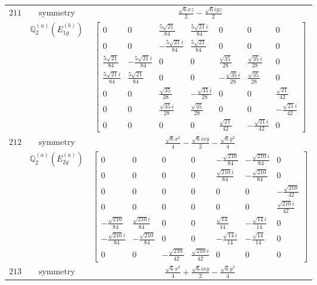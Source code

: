 \documentclass[fleqn,8pt,landscape]{jsarticle}
\begin{document}
\begin{longtable}{ccc}
$ 211 $ & $ \text{symmetry} $ & $ \frac{\sqrt{6} x z}{2} - \frac{\sqrt{6} i y z}{2} $ \\
$  $ & $ \mathbb{Q}_{2}^{(a)}(E_{1g}^{(b)}) $ & $ \begin{bmatrix} 0 & 0 & \frac{5 \sqrt{21}}{84} & \frac{5 \sqrt{21} i}{84} & 0 & 0 & 0 \\ 0 & 0 & - \frac{5 \sqrt{21} i}{84} & \frac{5 \sqrt{21}}{84} & 0 & 0 & 0 \\ \frac{5 \sqrt{21}}{84} & - \frac{5 \sqrt{21} i}{84} & 0 & 0 & \frac{\sqrt{35}}{28} & \frac{\sqrt{35} i}{28} & 0 \\ \frac{5 \sqrt{21} i}{84} & \frac{5 \sqrt{21}}{84} & 0 & 0 & - \frac{\sqrt{35} i}{28} & \frac{\sqrt{35}}{28} & 0 \\ 0 & 0 & \frac{\sqrt{35}}{28} & - \frac{\sqrt{35} i}{28} & 0 & 0 & \frac{\sqrt{21}}{42} \\ 0 & 0 & \frac{\sqrt{35} i}{28} & \frac{\sqrt{35}}{28} & 0 & 0 & - \frac{\sqrt{21} i}{42} \\ 0 & 0 & 0 & 0 & \frac{\sqrt{21}}{42} & - \frac{\sqrt{21} i}{42} & 0 \end{bmatrix} $ \\ \hline
$ 212 $ & $ \text{symmetry} $ & $ \frac{\sqrt{6} x^{2}}{4} - \frac{\sqrt{6} i x y}{2} - \frac{\sqrt{6} y^{2}}{4} $ \\
$  $ & $ \mathbb{Q}_{2}^{(a)}(E_{2g}^{(a)}) $ & $ \begin{bmatrix} 0 & 0 & 0 & 0 & - \frac{\sqrt{210}}{84} & - \frac{\sqrt{210} i}{84} & 0 \\ 0 & 0 & 0 & 0 & \frac{\sqrt{210} i}{84} & - \frac{\sqrt{210}}{84} & 0 \\ 0 & 0 & 0 & 0 & 0 & 0 & - \frac{\sqrt{210}}{42} \\ 0 & 0 & 0 & 0 & 0 & 0 & \frac{\sqrt{210} i}{42} \\ - \frac{\sqrt{210}}{84} & \frac{\sqrt{210} i}{84} & 0 & 0 & \frac{\sqrt{14}}{14} & - \frac{\sqrt{14} i}{14} & 0 \\ - \frac{\sqrt{210} i}{84} & - \frac{\sqrt{210}}{84} & 0 & 0 & - \frac{\sqrt{14} i}{14} & - \frac{\sqrt{14}}{14} & 0 \\ 0 & 0 & - \frac{\sqrt{210}}{42} & \frac{\sqrt{210} i}{42} & 0 & 0 & 0 \end{bmatrix} $ \\ \hline
$ 213 $ & $ \text{symmetry} $ & $ \frac{\sqrt{6} x^{2}}{4} + \frac{\sqrt{6} i x y}{2} - \frac{\sqrt{6} y^{2}}{4} $ \\

\end{longtable}
\end{document}
